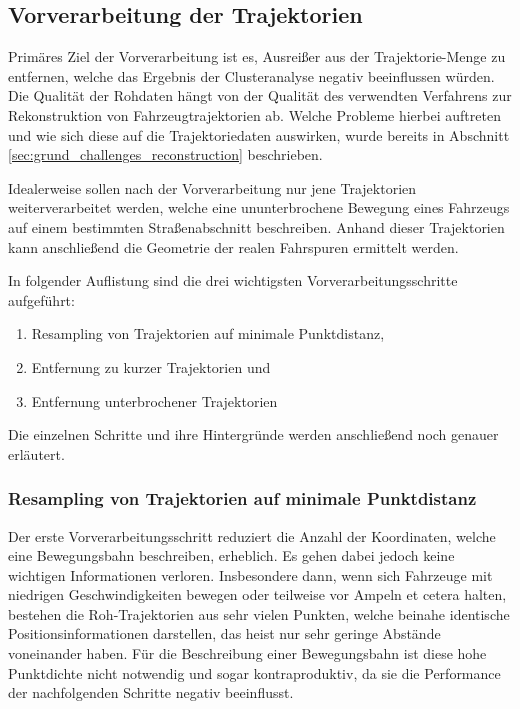 \subsection{Vorverarbeitung der Trajektorien}
\label{sec:realisation_preprocessing}

Primäres Ziel der Vorverarbeitung ist es, Ausreißer aus der
Trajektorie-Menge zu entfernen, welche das Ergebnis der Clusteranalyse negativ beeinflussen würden.
Die Qualität der Rohdaten hängt von der Qualität des verwendten Verfahrens zur Rekonstruktion von Fahrzeugtrajektorien
ab. Welche Probleme hierbei auftreten und wie sich diese auf die Trajektoriedaten auswirken, wurde bereits in
Abschnitt \ref{sec:grund_challenges_reconstruction} beschrieben.

Idealerweise sollen nach der Vorverarbeitung nur jene Trajektorien weiterverarbeitet werden,
welche eine ununterbrochene Bewegung eines Fahrzeugs auf einem bestimmten Straßenabschnitt beschreiben.
Anhand dieser Trajektorien kann anschließend die Geometrie der realen Fahrspuren ermittelt werden.

In folgender Auflistung sind die drei wichtigsten Vorverarbeitungsschritte aufgeführt:

\begin{enumerate}
    \item Resampling von Trajektorien auf minimale Punktdistanz,
    \item Entfernung zu kurzer Trajektorien und
    \item Entfernung unterbrochener Trajektorien
\end{enumerate}

Die einzelnen Schritte und ihre Hintergründe werden anschließend noch genauer erläutert.

\subsubsection{Resampling von Trajektorien auf minimale Punktdistanz}
Der erste Vorverarbeitungsschritt reduziert die Anzahl der Koordinaten, welche eine Bewegungsbahn beschreiben, erheblich.
Es gehen dabei jedoch keine wichtigen Informationen verloren.
Insbesondere dann, wenn sich Fahrzeuge mit niedrigen
Geschwindigkeiten bewegen oder teilweise vor Ampeln et cetera halten, bestehen die Roh-Trajektorien aus sehr vielen
Punkten, welche beinahe identische Positionsinformationen darstellen, das heist nur sehr geringe
Abstände voneinander haben. Für die Beschreibung einer Bewegungsbahn ist diese hohe Punktdichte nicht notwendig
und sogar kontraproduktiv, da sie die Performance der nachfolgenden Schritte negativ beeinflusst.

